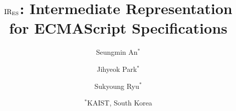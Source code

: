 \documentclass[11pt]{article}
\begin{document}


\title{\( \text{IR}_\text{ES} \): Intermediate Representation for ECMAScript Specifications}

\author{Seungmin An$^*$ \and Jihyeok Park$^*$ \and Sukyoung Ryu$^*$}

\date{$^*$KAIST, South Korea}
\maketitle



\end{document}
